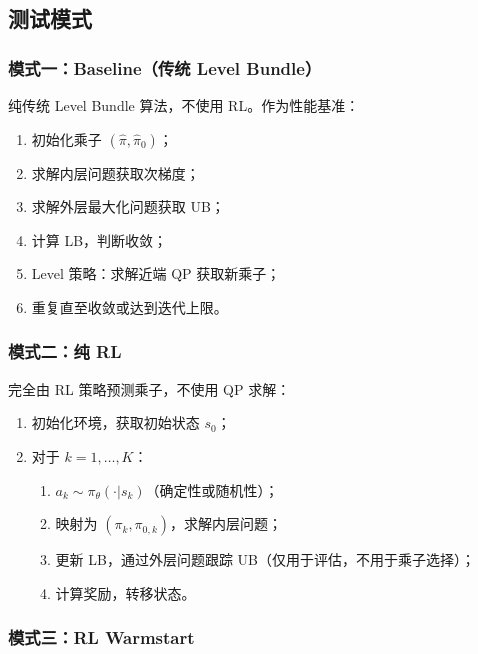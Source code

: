 \documentclass[11pt]{ctexart}
\begin{document}
\subsection{测试模式}

\subsubsection{模式一：Baseline（传统 Level Bundle）}

纯传统 Level Bundle 算法，不使用 RL。作为性能基准：
\begin{enumerate}[itemsep=2pt, topsep=2pt]
    \item 初始化乘子 $(\hat{\pi}, \hat{\pi}_0)$；
    \item 求解内层问题获取次梯度；
    \item 求解外层最大化问题获取 UB；
    \item 计算 LB，判断收敛；
    \item Level 策略：求解近端 QP 获取新乘子；
    \item 重复直至收敛或达到迭代上限。
\end{enumerate}

\subsubsection{模式二：纯 RL}

完全由 RL 策略预测乘子，不使用 QP 求解：
\begin{enumerate}[itemsep=2pt, topsep=2pt]
    \item 初始化环境，获取初始状态 $s_0$；
    \item 对于 $k = 1, \ldots, K$：
    \begin{enumerate}[itemsep=1pt, topsep=1pt]
        \item $a_k \sim \pi_\theta(\cdot | s_k)$（确定性或随机性）；
        \item 映射为 $(\pi_k, \pi_{0,k})$，求解内层问题；
        \item 更新 LB，通过外层问题跟踪 UB（仅用于评估，不用于乘子选择）；
        \item 计算奖励，转移状态。
    \end{enumerate}
\end{enumerate}

\subsubsection{模式三：RL Warmstart}
\end{document}
